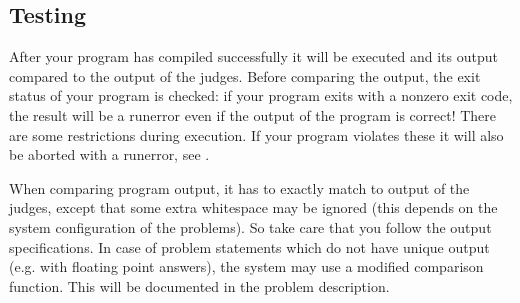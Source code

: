 \documentclass[a4paper,10pt,english,openany]{sphinxmanual}
\begin{document}
\subsection{Testing}
\label{\detokenize{team:testing}}\label{\detokenize{team:id2}}
\sphinxAtStartPar
After your program has compiled successfully it will be executed and
its output compared to the output of the judges. Before comparing the
output, the exit status of your program is checked: if your program
exits with a non\sphinxhyphen{}zero exit code, the result will be a run\sphinxhyphen{}error
even if the output of the program is correct!
There are some restrictions during execution. If your program violates
these it will also be aborted with a run\sphinxhyphen{}error,
see {\hyperref[\detokenize{team:runlimits}]{}}.

\sphinxAtStartPar
When comparing program output, it has to exactly match to output of
the judges, except that some extra whitespace may be ignored (this
depends on the system configuration of the problems). So take care
that you follow the output specifications. In case of problem
statements which do not have unique output (e.g. with floating point
answers), the system may use a modified comparison function.
This will be documented in the problem description.
\end{document}
